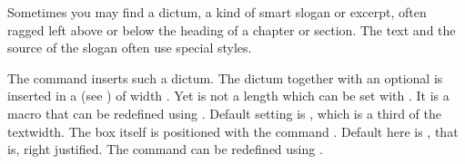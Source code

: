 Sometimes you may find a dictum, a kind of smart slogan or excerpt, often
ragged left above or below the heading of a chapter or section. The text and
the source of the slogan often use special styles.


\begin{Declaration}
\end{Declaration}%
The command  inserts such a dictum. %
%
The dictum together with an optional  is inserted in a
 (see \cite{latex:usrguide}) of width
. Yet  is not a length which can be set
with . It is a macro that can be redefined using
. Default setting is ,
which is a third of the textwidth. The box itself is positioned with the
command . Default here is
, that is, right justified.  The
command  can be redefined using .

